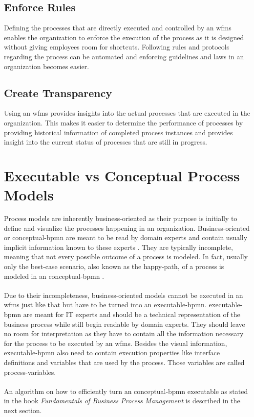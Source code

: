 \subsection{Enforce Rules}
Defining the processes that are directly executed and controlled by an \gls{wfms} enables the organization to enforce the execution of the process as it is designed without giving employees room for shortcuts. Following rules and protocols regarding the process can be automated and enforcing guidelines and laws in an organization becomes easier. \cite{fundamentals}

\subsection{Create Transparency}
Using an \gls{wfms} provides insights into the actual processes that are executed in the organization. This makes it easier to determine the performance of processes by providing historical information of completed process instances and provides insight into the current status of processes that are still in progress. \cite{gadatsch2020grundkurs}

\section{Executable vs Conceptual Process Models}
Process models are inherently business-oriented as their purpose is initially to define and visualize the processes happening in an organization. Business-oriented or \gls{conceptual-bpmn} are meant to be read by domain experts and contain usually implicit information known to these experts \cite{fundamentals}. They are typically incomplete, meaning that not every possible outcome of a process is modeled. In fact, usually only the best-case scenario, also known as the \gls{happy-path}, of a process is modeled in an \gls{conceptual-bpmn} \cite{freund2019real}.\\~\\Due to their incompleteness, business-oriented models cannot be executed in an \gls{wfms} just like that but have to be turned into an \gls{executable-bpmn}. \gls{executable-bpmn} are meant for IT experts and should be a technical representation of the business process while still begin readable by domain experts. They should leave no room for interpretation as they have to contain all the information necessary for the process to be executed by an \gls{wfms}. Besides the visual information, \gls{executable-bpmn} also need to contain execution properties like interface definitions and variables that are used by the process. Those variables are called \gls{process-variables}.\cite{fundamentals} \\~\\An algorithm on how to efficiently turn an \gls{conceptual-bpmn} executable as stated in the book \textit{Fundamentals of Business Process Management} \cite{fundamentals} is described in the next section. 

